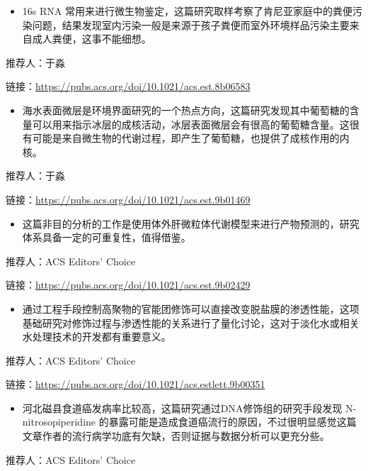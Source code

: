 \documentclass[]{book}
\providecommand{\tightlist}{%
  \setlength{\itemsep}{0pt}\setlength{\parskip}{0pt}}
\begin{document}
\begin{itemize}
\tightlist
\item
  16s RNA 常用来进行微生物鉴定，这篇研究取样考察了肯尼亚家庭中的粪便污染问题，结果发现室内污染一般是来源于孩子粪便而室外环境样品污染主要来自成人粪便，这事不能细想。
\end{itemize}

推荐人：于淼

链接：\url{https://pubs.acs.org/doi/10.1021/acs.est.8b06583}

\begin{itemize}
\tightlist
\item
  海水表面微层是环境界面研究的一个热点方向，这篇研究发现其中葡萄糖的含量可以用来指示冰层的成核活动，冰层表面微层会有很高的葡萄糖含量。这很有可能是来自微生物的代谢过程，即产生了葡萄糖，也提供了成核作用的内核。
\end{itemize}

推荐人：于淼

链接：\url{https://pubs.acs.org/doi/10.1021/acs.est.9b01469}

\begin{itemize}
\tightlist
\item
  这篇非目的分析的工作是使用体外肝微粒体代谢模型来进行产物预测的，研究体系具备一定的可重复性，值得借鉴。
\end{itemize}

推荐人：ACS Editors' Choice

链接：\url{https://pubs.acs.org/doi/10.1021/acs.est.9b02429}

\begin{itemize}
\tightlist
\item
  通过工程手段控制高聚物的官能团修饰可以直接改变脱盐膜的渗透性能，这项基础研究对修饰过程与渗透性能的关系进行了量化讨论，这对于淡化水或相关水处理技术的开发都有重要意义。
\end{itemize}

推荐人：ACS Editors' Choice

链接：\url{https://pubs.acs.org/doi/10.1021/acs.estlett.9b00351}

\begin{itemize}
\tightlist
\item
  河北磁县食道癌发病率比较高，这篇研究通过DNA修饰组的研究手段发现 N-nitrosopiperidine 的暴露可能是造成食道癌流行的原因，不过很明显感觉这篇文章作者的流行病学功底有欠缺，否则证据与数据分析可以更充分些。
\end{itemize}

推荐人：ACS Editors' Choice
\end{document}
